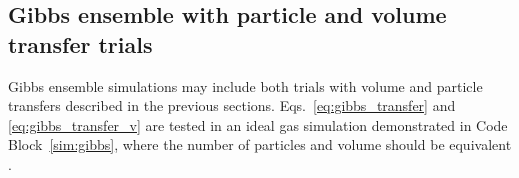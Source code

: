 \begin{figure}

\end{figure}

\subsection{\label{sec:lhs_gibbs}Gibbs ensemble with particle and volume transfer trials}

Gibbs ensemble simulations may include both trials with volume and particle transfers described in the previous sections.
Eqs.~\ref{eq:gibbs_transfer} and \ref{eq:gibbs_transfer_v} are tested in an ideal gas simulation demonstrated in Code Block~\ref{sim:gibbs}, where the number of particles and volume should be equivalent \cite{hatch_theory_2024}.

\begin{figure}

\end{figure}
